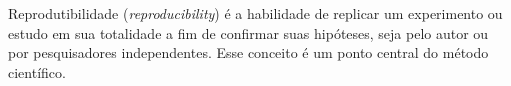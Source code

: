 
Reprodutibilidade ({\it reproducibility}) é a habilidade de replicar um
experimento ou estudo em sua totalidade a fim de confirmar suas hipóteses, seja
pelo autor ou por pesquisadores independentes. Esse conceito é um ponto central
do método científico.


